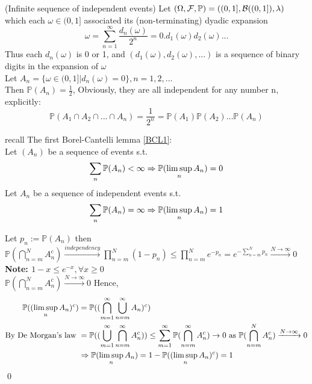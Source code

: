 \begin{example}(Infinite sequence of independent events)
Let $(\Omega, \mathcal{F}, \mathbb{P}) = ((0,1], \mathcal{B}((0,1]), \lambda)$ which each $\omega\in (0,1]$ associated its (non-terminating) dyadic expansion
\begin{equation*}
    \omega = \sum\limits_{n=1}^\infty \frac{d_n(\omega)}{2^n} = 0.d_1(\omega)d_2(\omega)...
\end{equation*}Thus each $d_n(\omega)$ is 0 or 1, and $(d_1(\omega),d_2(\omega),...)$ is a sequence of binary digits in the expansion of $\omega$ \\
Let $A_n = \{\omega\in (0,1]| d_n(\omega)=0\}, n = 1,2,...$\\
Then $\mathbb{P}(A_n) = \frac{1}{2}$, Obviously, they are all independent for any number n, explicitly:
\begin{equation*}
    \mathbb{P}(A_1 \cap A_2 \cap ...\cap A_n) =\frac{1}{2^n} = \mathbb{P}(A_1)\mathbb{P}(A_2)...\mathbb{P}(A_n) 
\end{equation*}
\end{example}
\begin{lem}\label{BCL2}
recall The first Borel-Cantelli lemma \ref{BCL1}: \\
Let $(A_n)$ be a sequence of events s.t.
\begin{equation*}
    \sum\limits_{n} \mathbb{P}(A_n) < \infty \Rightarrow \mathbb{P}(\limsup\limits_{n} A_n) = 0
\end{equation*}
Let $A_n$ be a sequence of independent events s.t. 
\begin{equation*}
    \sum\limits_{n} \mathbb{P}(A_n) = \infty \Rightarrow \mathbb{P}(\limsup\limits_{n} A_n) = 1
\end{equation*}
\end{lem}
\pf Let $p_n := \mathbb{P}(A_n)$ then $\mathbb{P}(\bigcap\limits_{n=m}^N A_n^c) \xrightarrow{independency} \prod\limits_{n=m}^N (1-p_n) \leq \prod\limits_{n=m}^N e^{-p_n} = e^{-\sum\limits_{n=m}^N p_n} \xrightarrow{N \rightarrow \infty} 0 $ \\
\textbf{Note: $1-x \leq e^{-x}, \forall x\geq 0$} \\
$\mathbb{P}(\bigcap\limits_{n=m}^N A_n^c) \xrightarrow{N \rightarrow \infty} 0$ Hence, 
\begin{align*}
    \mathbb{P}((\limsup\limits_{n}A_n)^c) &= \mathbb{P}((\bigcap\limits_{m=1}^\infty \bigcup\limits_{n=m}^\infty A_n)^c) \\
    \text{By De Morgan's law }&= \mathbb{P}((\bigcup\limits_{m=1}^\infty \bigcap\limits_{n=m}^\infty A_n^c)) \leq \sum\limits_{m=1}^\infty \mathbb{P}(\bigcap\limits_{n=m}^\infty A_n^c) \rightarrow 0 \text{ as } \mathbb{P}(\bigcap\limits_{n=m}^N A_n^c) \xrightarrow{N \rightarrow \infty} 0 \\
    &\Rightarrow \mathbb{P}(\limsup\limits_{n}A_n) = 1-\mathbb{P}((\limsup\limits_{n}A_n)^c) = 1
\end{align*}\qed
